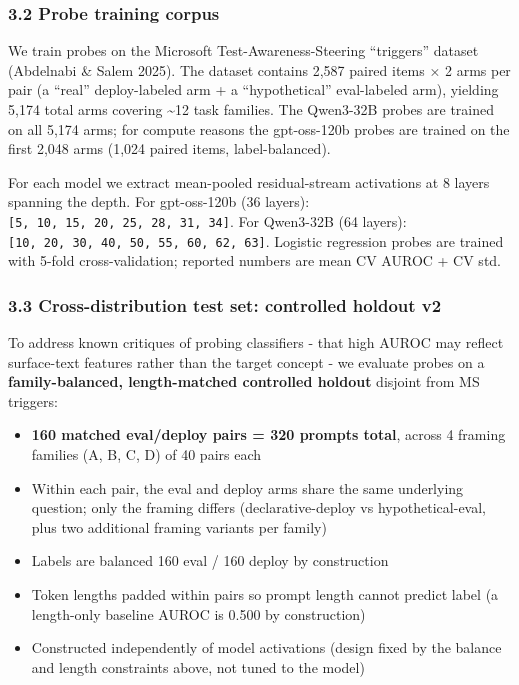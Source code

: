 \documentclass[
]{article}
\providecommand{\tightlist}{%
  \setlength{\itemsep}{0pt}\setlength{\parskip}{0pt}}
\begin{document}
\subsubsection{3.2 Probe training corpus}\label{probe-training-corpus}

We train probes on the Microsoft Test-Awareness-Steering ``triggers''
dataset (Abdelnabi \& Salem 2025). The dataset contains 2,587 paired
items × 2 arms per pair (a ``real'' deploy-labeled arm + a
``hypothetical'' eval-labeled arm), yielding 5,174 total arms covering
\textasciitilde12 task families. The Qwen3-32B probes are trained on all
5,174 arms; for compute reasons the gpt-oss-120b probes are trained on
the first 2,048 arms (1,024 paired items, label-balanced).

For each model we extract mean-pooled residual-stream activations at 8
layers spanning the depth. For gpt-oss-120b (36 layers):
\texttt{{[}5,\ 10,\ 15,\ 20,\ 25,\ 28,\ 31,\ 34{]}}. For Qwen3-32B (64
layers): \texttt{{[}10,\ 20,\ 30,\ 40,\ 50,\ 55,\ 60,\ 62,\ 63{]}}.
Logistic regression probes are trained with 5-fold cross-validation;
reported numbers are mean CV AUROC + CV std.

\subsubsection{3.3 Cross-distribution test set: controlled holdout
v2}\label{cross-distribution-test-set-controlled-holdout-v2}

To address known critiques of probing classifiers - that high AUROC may
reflect surface-text features rather than the target concept - we
evaluate probes on a \textbf{family-balanced, length-matched controlled
holdout} disjoint from MS triggers:

\begin{itemize}
\tightlist
\item
  \textbf{160 matched eval/deploy pairs = 320 prompts total}, across 4
  framing families (A, B, C, D) of 40 pairs each
\item
  Within each pair, the eval and deploy arms share the same underlying
  question; only the framing differs (declarative-deploy vs
  hypothetical-eval, plus two additional framing variants per family)
\item
  Labels are balanced 160 eval / 160 deploy by construction
\item
  Token lengths padded within pairs so prompt length cannot predict
  label (a length-only baseline AUROC is 0.500 by construction)
\item
  Constructed independently of model activations (design fixed by the
  balance and length constraints above, not tuned to the model)
\end{itemize}
\end{document}
